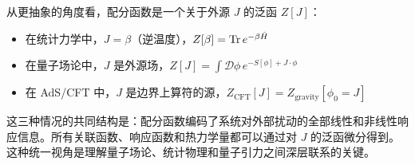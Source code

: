 \begin{note}[配分函数的统一视角]
从更抽象的角度看，配分函数是一个关于外源 $J$ 的泛函 $Z[J]$：
\begin{itemize}
    \item 在统计力学中，$J = \beta$（逆温度），$Z[\beta] = \Tr e^{-\beta\hat{H}}$
    \item 在量子场论中，$J$ 是外源场，$Z[J] = \int \mathcal{D}\phi \, e^{-S[\phi] + J\cdot\phi}$
    \item 在 AdS/CFT 中，$J$ 是边界上算符的源，$Z_{\text{CFT}}[J] = Z_{\text{gravity}}[\phi_0 = J]$
\end{itemize}
这三种情况的共同结构是：配分函数编码了系统对外部扰动的全部线性和非线性响应信息。所有关联函数、响应函数和热力学量都可以通过对 $J$ 的泛函微分得到。这种统一视角是理解量子场论、统计物理和量子引力之间深层联系的关键。
\end{note}

